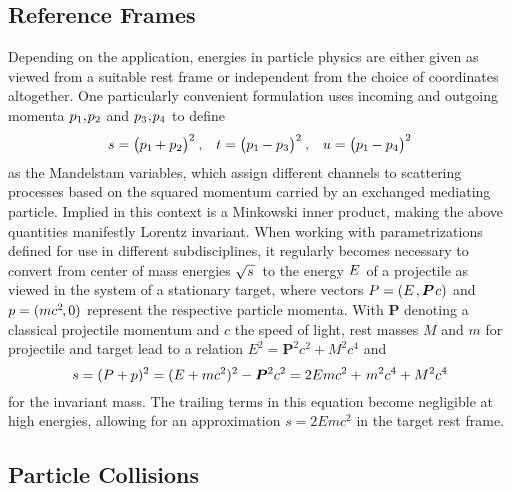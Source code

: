 \begin{spacing}{0.985}
	\subsection{Reference Frames}
	\label{sub:frames}

	Depending on the application, energies in particle physics are either given as viewed from a suitable rest frame or independent from
	the choice of coordinates altogether. One particularly convenient formulation uses incoming and outgoing momenta
	$p_1 , \kern-1.0pt p_2$ and $p_3 \kern+0.5pt , \kern-1.0pt p_4$ to define
	\begin{align}
		s = \bigl( p_1 \kern-0.5pt + p_2 \bigr)^2 \: , &&
		t = \bigl( p_1 \kern-0.5pt - p_3 \bigr)^2 \: , &&
		u = \bigl( p_1 \kern-0.5pt - p_4 \bigr)^2
	\end{align}
	as the Mandelstam variables, which assign different channels to scattering processes based on the squared momentum carried by an
	exchanged mediating particle. Implied in this context is a Minkowski inner product, making the above quantities manifestly Lorentz
	invariant. When working with parametrizations defined for use in different subdisciplines, it regularly becomes necessary to convert
	from center of mass energies $\sqrt{s \kern+1.0pt} \kern+1.0pt$ to the energy $\kern-0.5pt E \kern+1.0pt$ of a projectile as viewed
	in the system of a stationary target, where vectors $P = (E \kern+1.0pt , \bm{P} \kern+0.75pt c)$ and $p = (m c^2 \kern-1.0pt , 0)$
	represent the respective particle momenta. With $\bm{P}$ denoting a classical projectile momentum and $c$ the speed of light,
	rest masses $M$ and $m$ for projectile and target lead to a relation $E^2 = \bm{P}^2 c^2 + M^2 c^4$ and
	\begin{equation}
		s = (P + p)^2 = (E + m c^2)^2 - \bm{P}^2 c^2 = 2E m c^2 + \kern+1.0pt m^2 c^4 + M^2 c^4
	\end{equation}
	for the invariant mass. The trailing terms in this equation become negligible at high energies, allowing for an approximation
	$s = 2E m c^2$ in the target rest frame.



	\subsection{Particle Collisions}
	\label{sub:collisions}


\end{spacing}
